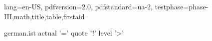 \DocumentMetadata
  {
    lang=en-US,
    pdfversion=2.0,
    pdfstandard=ua-2,
    testphase={phase-III,math,title,table,firstaid}
  }
\begin{filecontents}{german.ist}
actual '=' %
quote '!' %
level '>' %
\end{filecontents}
\documentclass[a4paper,12pt]{article}
\usepackage[T1]{fontenc}
\usepackage[ngerman]{babel}
\usepackage{makeidx}
\usepackage{sanitize-umlaut}
\usepackage[hyperindex,colorlinks]{hyperref}
\makeindex

\section{Basic Example}
Test äöüÄÖÜß.
\index{Aber} \index{Arg} \index{Ärger}
\index{Ofen} \index{Ö - wie schön} \index{oberhalb}
\index{Ufer} \index{Übermaß}
\index{Latex=\LaTeX} \index{Ärger>Index}
Test äöüÄÖÜß.
\printindex
